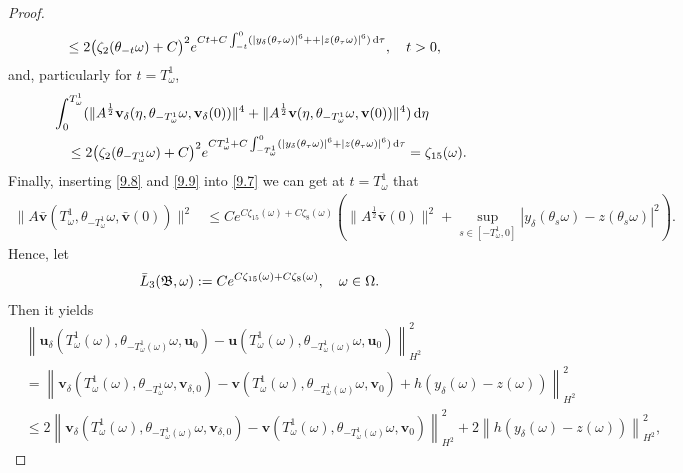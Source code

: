 \documentclass{elsarticle}
\theoremstyle{definition}
\numberwithin{equation}{section}
\renewcommand{\d}{{\rm{d}}}
\begin{document}
\begin{proof}
\begin{align*}
 &   \leq  2\big( \zeta_2(\theta_{-t}\omega)  +C \big)^2  e^{ Ct+C \int^0_{-t} ( |y_\delta(\theta_{\tau} \omega)|^6 ++|z(\theta_{\tau} \omega)|^6)\, \d \tau}   ,
   \quad t>0  , \nonumber
\end{align*}
and, particularly for $t=T_\omega^1$,
 \begin{align}\label{9.9}
 & \int_0^{T_\omega^1}
 (\|A^{\frac 12} \textbf{v}_\delta(\eta, \theta_{-{T_\omega^1}} \omega, \textbf{v}_\delta(0))\|^4+\|A^{\frac 12} \textbf{v}(\eta, \theta_{-{T_\omega^1}} \omega, \textbf{v}(0))\|^4 )\, \d \eta \nonumber \\
 &   \quad  \leq  2\big( \zeta_2(\theta_{-{T_\omega^1}}\omega)  +C \big)^2  e^{ C {T_\omega^1}+C \int^0_{-{T_\omega^1}}  (|y_\delta(\theta_{\tau} \omega)|^6+|z(\theta_{\tau} \omega)|^6 )\, \d \tau} =\zeta_{15}(\omega).
\end{align}
Finally, inserting     \eqref{9.8}  and \eqref{9.9}  into \eqref{9.7}  we can get at $t=T_\omega^1$ that
\begin{align*}
 \|A\bar{\textbf{v}}(T_\omega^1 ,\theta_{-T_\omega^1 }\omega,\bar{\textbf{v}}(0))\|^2
&\leq Ce^{ C \zeta_{15}(\omega)+C\zeta_8(\omega) } \left(\|A^\frac12\bar{\textbf{v}}(0)\|^2+ \sup\limits_{s\in[-T_\omega^1,0]}|y_\delta(\theta_{s}\omega)-z(\theta_{s}\omega)|^2\right). \nonumber
\end{align*}
Hence, let
\begin{align*}
 \bar{L}_3 (\mathfrak B, \omega) :=   Ce^{ C \zeta_{15}(\omega)+C\zeta_8(\omega) }  ,\quad \omega\in \Omega. \qedhere
\end{align*}
Then it yields
\begin{align*}
&\left \| \textbf{u}_\delta \! \left ( T_\omega^1 (\omega) ,\theta_{-T_\omega^1(\omega)}\omega,  \textbf{u}_{0}\right)
 - \textbf{u} \! \left ( T_\omega^1 (\omega) ,\theta_{-T_\omega^1(\omega)}\omega, \textbf{u}_{0}\right) \right \|^2_{H^2}
 \nonumber\\
& =\left \| \textbf{v}_\delta \! \left ( T_\omega^1 (\omega) ,\theta_{-T_\omega^1}\omega,  \textbf{v}_{\delta,0}\right)
 - \textbf{v} \! \left ( T_\omega^1 (\omega) ,\theta_{-T_\omega^1(\omega)}\omega, \textbf{v}_{0}\right)+h(y_\delta(\omega)-z(\omega)) \right \|^2_{H^2}\nonumber\\
&\leq 2\left \| \textbf{v}_\delta \! \left ( T_\omega^1 (\omega) ,\theta_{-T_\omega^1(\omega)}\omega,  \textbf{v}_{\delta,0}\right)
 - \textbf{v} \! \left ( T_\omega^1 (\omega) ,\theta_{-T_\omega^1(\omega)}\omega, \textbf{v}_{0}\right)\right\|^2_{H^2}+2\left\|h\left (y_\delta(\omega)-z(\omega)\right ) \right \|^2_{H^2},

\end{align*}
\end{proof}
\end{document}
